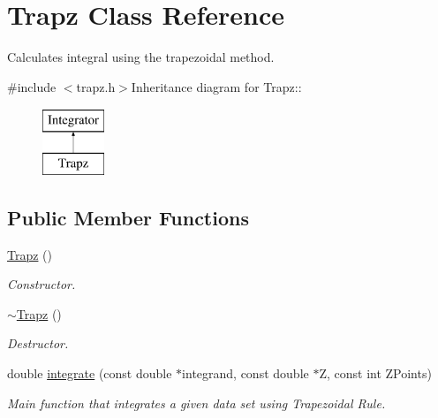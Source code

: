\hypertarget{classTrapz}{
\section{Trapz Class Reference}
\label{d8/da8/classTrapz}
}


Calculates integral using the trapezoidal method.  


{\ttfamily \#include $<$trapz.h$>$}Inheritance diagram for Trapz::\begin{figure}[H]
\begin{center}
\leavevmode
\includegraphics[height=2cm]{d8/da8/classTrapz}
\end{center}
\end{figure}
\subsection*{Public Member Functions}
\begin{DoxyCompactItemize}
\item 
\hypertarget{classTrapz_a464cc7e5b33620d799cb89f69f70f1b4}{
\hyperlink{classTrapz_a464cc7e5b33620d799cb89f69f70f1b4}{Trapz} ()}
\label{d8/da8/classTrapz_a464cc7e5b33620d799cb89f69f70f1b4}

\begin{DoxyCompactList}\small\item\em Constructor. \item\end{DoxyCompactList}\item 
\hypertarget{classTrapz_adff2586590ecb48620b749a0966f32a7}{
\hyperlink{classTrapz_adff2586590ecb48620b749a0966f32a7}{$\sim$Trapz} ()}
\label{d8/da8/classTrapz_adff2586590ecb48620b749a0966f32a7}

\begin{DoxyCompactList}\small\item\em Destructor. \item\end{DoxyCompactList}\item 
double \hyperlink{classTrapz_a8aee327ed631f75ef3dea7e458f71cca}{integrate} (const double $\ast$integrand, const double $\ast$Z, const int ZPoints)
\begin{DoxyCompactList}\small\item\em Main function that integrates a given data set using Trapezoidal Rule. \item\end{DoxyCompactList}\end{DoxyCompactItemize}


